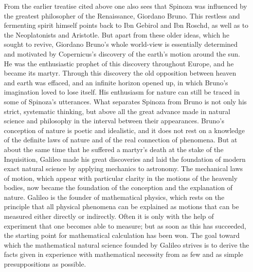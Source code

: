 \documentclass[12pt]{book}
\newcommand{\opage}[1]{\marginnote{\footnotesize\textit{[#1]}}}
\begin{document}
From the earlier treatise cited above one also sees that Spinoza was influenced by
the greatest philosopher of the Renaissance, Giordano Bruno. This restless and
fermenting spirit himself points back to Ibn Gebirol and Ibn Roschd, as well as to
the Neoplatonists and Aristotle. But apart from these older ideas, which he sought
to revive, Giordano Bruno's whole world-view is essentially determined and motivated
by Copernicus's discovery of the earth's motion around the sun. He was the
enthusiastic prophet of this discovery throughout Europe, and he became its martyr.
Through this discovery the old opposition between heaven and earth was effaced, and
an infinite horizon opened up, in which Bruno's imagination loved to lose itself.
His enthusiasm for nature \opage{12}can still be traced in some of Spinoza's
utterances. What separates Spinoza from Bruno is not only his strict, systematic
thinking, but above all the great advance made in natural science and philosophy in
the interval between their appearances. Bruno's conception of nature is poetic and
idealistic, and it does not rest on a knowledge of the definite laws of nature and
of the real connection of phenomena. But at about the same time that he suffered a
martyr's death at the stake of the Inquisition, Galileo made his great discoveries
and laid the foundation of modern exact natural science by applying mechanics to
astronomy. The mechanical laws of motion, which appear with particular clarity in the
motions of the heavenly bodies, now became the foundation of the conception and the
explanation of nature. Galileo is the founder of mathematical physics, which rests
on the principle that all physical phenomena can be explained as motions that can be
measured either directly or indirectly. Often it is only with the help of experiment
that one becomes able to measure; but as soon as this has succeeded, the starting
point for mathematical calculation has been won. The goal toward which the
mathematical natural science founded by Galileo strives is to derive the facts given
in experience with mathematical necessity from as few and as simple presuppositions
as possible.
\end{document}
